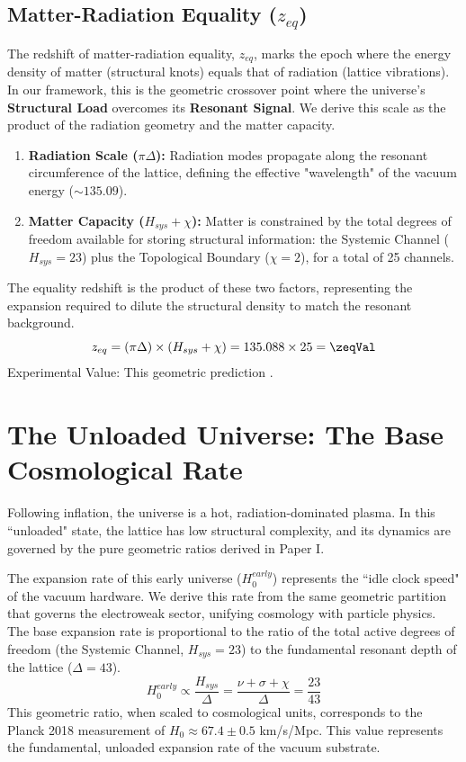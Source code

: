 \subsection{Matter-Radiation Equality (\texorpdfstring{$z_{eq}$}{zeq})}
The redshift of matter-radiation equality, $z_{eq}$, marks the epoch where the energy density of matter (structural knots) equals that of radiation (lattice vibrations). In our framework, this is the geometric crossover point where the universe's \textbf{Structural Load} overcomes its \textbf{Resonant Signal}. We derive this scale as the product of the radiation geometry and the matter capacity.
\begin{enumerate}
    \item \textbf{Radiation Scale ($\pi \Delta$):} Radiation modes propagate along the resonant circumference of the lattice, defining the effective "wavelength" of the vacuum energy ($\sim 135.09$).
    \item \textbf{Matter Capacity ($H_{sys} + \chi$):} Matter is constrained by the total degrees of freedom available for storing structural information: the Systemic Channel ($H_{sys}=23$) plus the Topological Boundary ($\chi=2$), for a total of 25 channels.
\end{enumerate}
The equality redshift is the product of these two factors, representing the expansion required to dilute the structural density to match the resonant background.
\begin{equation}
z_{eq} = (\pi \Delta) \times (H_{sys} + \chi) = 135.088 \times 25 = \mathbf{\zeqVal}
\end{equation}
Experimental Value: \zeqExperimentalValue
This geometric prediction \zeqAccText.




\section{The Unloaded Universe: The Base Cosmological Rate}
Following inflation, the universe is a hot, radiation-dominated plasma. In this ``unloaded" state, the lattice has low structural complexity, and its dynamics are governed by the pure geometric ratios derived in Paper I.

The expansion rate of this early universe ($H_0^{early}$) represents the ``idle clock speed" of the vacuum hardware. We derive this rate from the same geometric partition that governs the electroweak sector, unifying cosmology with particle physics. The base expansion rate is proportional to the ratio of the total active degrees of freedom (the Systemic Channel, $H_{sys}=23$) to the fundamental resonant depth of the lattice ($\Delta=43$).
\begin{equation}
H_0^{early} \propto \frac{H_{sys}}{\Delta} = \frac{\nu + \sigma + \chi}{\Delta} = \frac{23}{43}
\end{equation}
This geometric ratio, when scaled to cosmological units, corresponds to the Planck 2018 measurement of $H_0 \approx \mathbf{67.4 \pm 0.5}$ km/s/Mpc. This value represents the fundamental, unloaded expansion rate of the vacuum substrate.


